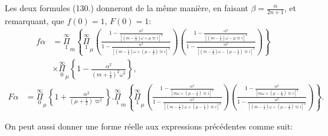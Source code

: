 \documentclass{article}
\begin{document}
Les deux formules (130.) donneront de la même manière, en faisant $\beta=\frac{\alpha}{2n+1}$, et remarquant, que $f(0)=1$, $F(0)=1$:
\[ \begin{aligned}f\alpha&=\overset{\infty}{\underset{1}{\Pi}}_{m}\left\{\overset{\infty}{\underset{1}{\Pi}}_{\mu}\left(\frac{1-\frac{\alpha^{2}}{[(m-\tfrac{1}{2})\omega+\mu\varpi i]^{2}}}{1-\frac{\alpha^{2}}{[(m-\tfrac{1}{2})\omega+(\mu-\tfrac{1}{2})\varpi i]^{2}}}\right)\left(\frac{1-\frac{\alpha^{2}}{[(m-\tfrac{1}{2})\omega-\mu\varpi i]^{2}}}{1-\frac{\alpha^{2}}{[(m-\tfrac{1}{2})\omega-(\mu-\tfrac{1}{2})\varpi i]^{2}}}\right)\right\}\\ &\times\overset{\infty}{\underset{0}{\Pi}}_{\mu}\left\{1-\frac{\alpha^{2}}{(m+\tfrac{1}{2})^{2}\omega^{2}}\right\},\end{aligned} \tag{176.} \]
\[ \begin{aligned}F\alpha&=\overset{\infty}{\underset{0}{\Pi}}_{\mu}\left\{1+\frac{\alpha^{2}}{(\mu+\tfrac{1}{2})\varpi^{2}}\right\}.\overset{\infty}{\underset{1}{\Pi}}_{m}\left\{\overset{\infty}{\underset{1}{\Pi}}_{\mu}\left(\frac{1-\frac{\alpha^{2}}{[m\omega+(\mu-\tfrac{1}{2})\varpi i]^{2}}}{1-\frac{\alpha^{2}}{[(m-\tfrac{1}{2})\omega+(\mu-\tfrac{1}{2})\varpi i]^{2}}}\right)\left(\frac{1-\frac{\alpha^{2}}{[m\omega+(\mu-\tfrac{1}{2})\varpi i]^{2}}}{1-\frac{\alpha^{2}}{[(m-\tfrac{1}{2})\omega+(\mu-\tfrac{1}{2})\varpi i]^{2}}}\right)\right\}.\end{aligned} \tag{177.} \]

On peut aussi donner une forme réelle aux expressions précédentes comme suit:
\end{document}
